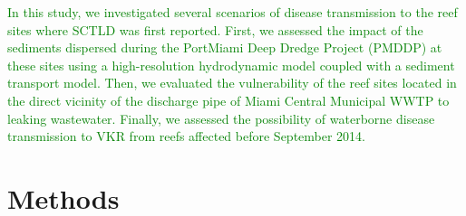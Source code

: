 \documentclass[preprint,12pt,authoryear]{elsarticle}
\newcommand{\modif}[1]{\textcolor{green}{#1}}
\begin{document}
\modif{In this study, we investigated several scenarios of disease transmission to the reef sites where SCTLD was first reported. First, we assessed the impact of the sediments dispersed during the PortMiami Deep Dredge Project (PMDDP) at these sites using a high-resolution hydrodynamic model coupled with a sediment transport model. Then, we evaluated the vulnerability of the reef sites located in the direct vicinity of the discharge pipe of Miami Central Municipal WWTP to leaking wastewater. Finally, we assessed the possibility of waterborne disease transmission to VKR from reefs affected before September 2014.}


\section{Methods}
\end{document}
